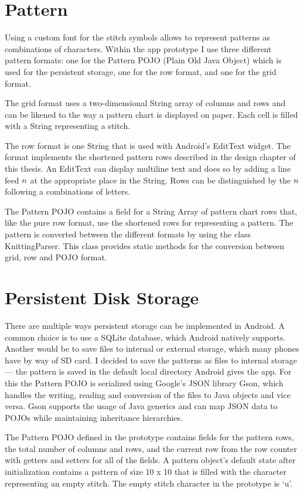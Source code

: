 \documentclass[a4paper,11pt]{kth-mag}
\begin{document}
\section{Pattern}
Using a custom font for the stitch symbols allows to represent patterns as combinations of characters. Within the app prototype I use three different pattern formats: one for the Pattern POJO (Plain Old Java Object) which is used for the persistent storage, one for the row format, and one for the grid format.

The grid format uses a two-dimensional String array of columns and rows and can  be likened to the way a pattern chart is displayed on paper. Each cell is filled with a String representing a stitch.

The row format is one String that is used with Android’s EditText widget. The format implements the shortened pattern rows described in the design chapter of this thesis. An EditText can display multiline text and does so by adding a line feed $\\n$ at the appropriate place in the String. Rows can be distinguished by the $\\n$ following a combinations of letters.

The Pattern POJO contains a field for a String Array of pattern chart rows that, like the pure row format, use the shortened rows for representing a pattern.
The pattern is converted between the different formats by using the class KnittingParser. This class provides static methods for the conversion between grid, row and POJO format.

\section{Persistent Disk Storage}
There are multiple ways persistent storage can be implemented in Android. A common choice is to use a SQLite database, which Android natively supports. Another would be to save files to internal or external storage, which many phones have by way of SD card.
I decided to save the patterns as files to internal storage --- the pattern is saved in the default local directory Android gives the app. For this the Pattern POJO is serialized using Google’s JSON library Gson, which handles the writing, reading and conversion of the files to Java objects and vice versa. Gson supports the usage of Java generics and can map JSON data to POJOs while maintaining inheritance hierarchies.

The Pattern POJO defined in the prototype contains fields for the pattern rows, the total number of columns and rows, and the current row from the row counter with getters and setters for all of the fields. A pattern object’s default state after initialization contains a pattern of size 10 x 10 that is filled with  the character representing an empty stitch. The empty stitch character in the prototype is ‘u’.
\end{document}
